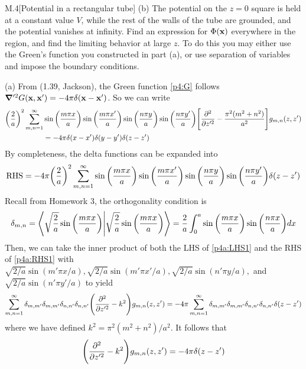 \documentclass[12pt]{article}
\begin{document}
\begin{problem}{M.4}[Potential in a rectangular tube]
(b) The potential on the $z=0$ square is held at a constant value $V$, while the
rest of the walls of the tube are grounded, and the potential vanishes at
infinity. Find an expression for $\Phi(\vb{x})$ everywhere in the region, and
find the limiting behavior at large $z$. To do this you may either use the
Green's function you constructed in part (a), or use separation of variables and
impose the boundary conditions.
\begin{solution}
(a) From (1.39, Jackson), the Green function \eqref{p4:G} follows
$\grad'^2G(\vb{x},\vb{x}')=-4\pi\delta(\vb{x}-\vb{x}')$. So we can write
\begin{align}\label{p4a:LHS1}
    \qty(\frac2a)^2\sum_{m,n=1}^\infty
    &\sin\qty(\frac{m\pi x}{a})\sin\qty(\frac{m\pi x'}{a})
    \sin\qty(\frac{n\pi y}{a})\sin\qty(\frac{n\pi y'}{a})
    \qty[\frac{\partial^2}{\partial z'^2}
    -\frac{\pi^2(m^2+n^2)}{a^2}]g_{m,n}(z,z')\notag\\
    &=-4\pi\delta(x-x')\delta(y-y')\delta(z-z')
\end{align}
By completeness, the delta functions can be expanded into
\begin{equation}\label{p4a:RHS1}
    \text{RHS}=-4\pi\qty(\frac2a)^2\sum_{m,n=1}^\infty 
    \sin\qty(\frac{m\pi x}{a})\sin\qty(\frac{m\pi x'}{a})
    \sin\qty(\frac{n\pi y}{a})\sin\qty(\frac{n\pi y'}{a})
    \delta(z-z')
\end{equation}
Recall from Homework 3, the orthogonality condition is
\begin{equation}
    \delta_{m,n}=\braket{\sqrt{\frac2a}\sin\qty(\frac{m\pi x}{a})}{\sqrt{\frac2a}\sin\qty(\frac{m\pi x}{a})}
    =\frac2a\int_0^a\sin\qty(\frac{m\pi x}{a})\sin\qty(\frac{n\pi x}{a})dx
\end{equation}
Then, we can take the inner product of both the LHS of \eqref{p4a:LHS1} and the
RHS of \eqref{p4a:RHS1} with $\sqrt{2 /a}\sin(m'\pi x /a), \sqrt{2 /a}\sin(m'\pi
x' /a), \sqrt{2 /a}\sin(n'\pi y /a),$ and $\sqrt{2 /a}\sin(n'\pi y' /a)$ to
yield
\begin{equation}
    \sum_{m,n=1}^\infty\delta_{m,m'}\delta_{m,m'}\delta_{n,n'}\delta_{n,n'}\qty(\frac{\partial^2}{\partial
    z'^2}-k^2)g_{m,n}(z,z')=-4\pi\sum_{m,n=1}^\infty\delta_{m,m'}\delta_{m,m'}\delta_{n,n'}\delta_{n,n'}\delta(z-z')
\end{equation}
where we have defined $k^2=\pi^2(m^2+n^2) /a^2$. It follows that
\begin{equation}\label{p4a:DE}
    \qty(\frac{\partial^2}{\partial z'^2}-k^2)g_{m,n}(z,z')=-4\pi\delta(z-z') 
\end{equation}

\end{solution}
\end{problem}
\end{document}
